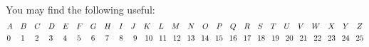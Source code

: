 \documentclass[11pt,addpoints,letterpaper]{exam}
\begin{document}


{\centering

\\[2em]
You may find the following useful:
\begin{align*}
&A\hspace{.35cm} B\hspace{.35cm}C\hspace{.35cm}D\hspace{.35cm}E\hspace{.35cm}F\hspace{.35cm}G\hspace{.35cm}H\hspace{.35cm}I\hspace{.35cm}J\hspace{.35cm}K\hspace{.35cm}L\hspace{.35cm}M\hspace{.35cm}N\hspace{.35cm}O\hspace{.35cm}P\hspace{.35cm}Q\hspace{.35cm}R\hspace{.35cm}S\hspace{.35cm}T\hspace{.35cm}U\hspace{.35cm}V\hspace{.35cm}W\hspace{.35cm}X\hspace{.35cm}Y\hspace{.35cm}Z\\
&0\hspace{.46cm} 1\hspace{.46cm} 2\hspace{.46cm} 3\hspace{.46cm} 4\hspace{.46cm} 5\hspace{.46cm} 6\hspace{.46cm} 7\hspace{.46cm} 8\hspace{.46cm} 9\hspace{.35cm} 10\hspace{.285cm} 11\hspace{.285cm} 12\hspace{.285cm} 13\hspace{.285cm} 14\hspace{.285cm} 15\hspace{.285cm}16\hspace{.285cm}17\hspace{.285cm}18\hspace{.285cm}19\hspace{.285cm}20\hspace{.285cm}21\hspace{.285cm}22\hspace{.285cm}23\hspace{.285cm}24\hspace{.285cm}25
\end{align*}
}
\end{document}
